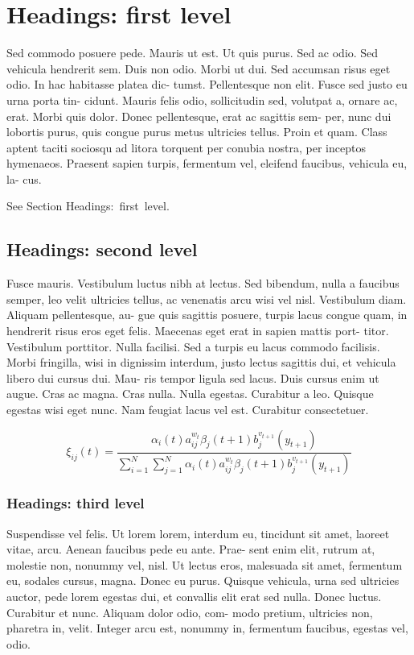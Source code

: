 \documentclass[ twocolumns, longauth ]{aa}
\begin{document}
\section{Headings: first level}\label{sec:headings}

Sed commodo posuere pede. Mauris ut est. Ut quis purus. Sed
ac odio. Sed vehicula hendrerit sem. Duis non odio. Morbi ut
dui. Sed accumsan risus eget odio. In hac habitasse platea dic-
tumst. Pellentesque non elit. Fusce sed justo eu urna porta tin-
cidunt. Mauris felis odio, sollicitudin sed, volutpat a, ornare ac,
erat. Morbi quis dolor. Donec pellentesque, erat ac sagittis sem-
per, nunc dui lobortis purus, quis congue purus metus ultricies
tellus. Proin et quam. Class aptent taciti sociosqu ad litora
torquent per conubia nostra, per inceptos hymenaeos. Praesent
sapien turpis, fermentum vel, eleifend faucibus, vehicula eu, la-
cus.

See Section Headings:~first~level.

\subsection{Headings: second level}

Fusce mauris. Vestibulum luctus nibh at lectus. Sed bibendum,
nulla a faucibus semper, leo velit ultricies tellus, ac venenatis
arcu wisi vel nisl. Vestibulum diam. Aliquam pellentesque, au-
gue quis sagittis posuere, turpis lacus congue quam, in hendrerit
risus eros eget felis. Maecenas eget erat in sapien mattis port-
titor. Vestibulum porttitor. Nulla facilisi. Sed a turpis eu lacus
commodo facilisis. Morbi fringilla, wisi in dignissim interdum,
justo lectus sagittis dui, et vehicula libero dui cursus dui. Mau-
ris tempor ligula sed lacus. Duis cursus enim ut augue. Cras
ac magna. Cras nulla. Nulla egestas. Curabitur a leo. Quisque
egestas wisi eget nunc. Nam feugiat lacus vel est. Curabitur
consectetuer.

\begin{equation}
\xi _{ij}(t)= {\frac {\alpha _{i}(t)a^{w_t}_{ij}\beta _{j}(t+1)b^{v_{t+1}}_{j}(y_{t+1})}{\sum _{i=1}^{N} \sum _{j=1}^{N} \alpha _{i}(t)a^{w_t}_{ij}\beta _{j}(t+1)b^{v_{t+1}}_{j}(y_{t+1})}}
\end{equation}

\subsubsection{Headings: third level}

Suspendisse vel felis. Ut lorem lorem, interdum eu, tincidunt sit
amet, laoreet vitae, arcu. Aenean faucibus pede eu ante. Prae-
sent enim elit, rutrum at, molestie non, nonummy vel, nisl. Ut
lectus eros, malesuada sit amet, fermentum eu, sodales cursus,
magna. Donec eu purus. Quisque vehicula, urna sed ultricies
auctor, pede lorem egestas dui, et convallis elit erat sed nulla.
Donec luctus. Curabitur et nunc. Aliquam dolor odio, com-
modo pretium, ultricies non, pharetra in, velit. Integer arcu est,
nonummy in, fermentum faucibus, egestas vel, odio.
\end{document}
